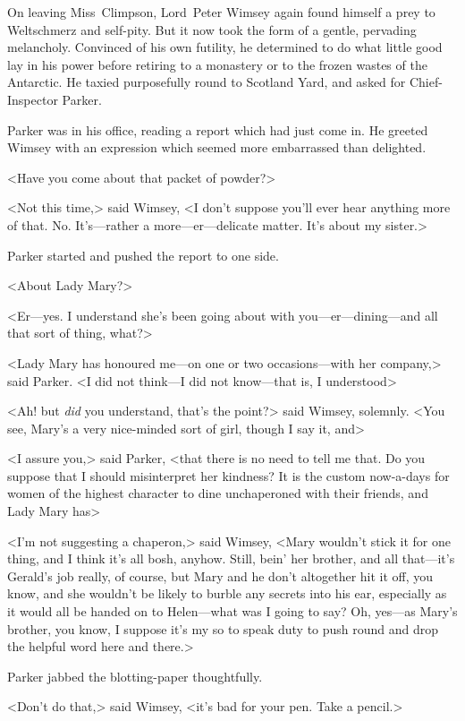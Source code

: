 On leaving Miss~Climpson, Lord~Peter Wimsey again found himself a prey to Weltschmerz and self-pity. But it now took the form of a gentle, pervading melancholy. Convinced of his own futility, he determined to do what little good lay in his power before retiring to a monastery or to the frozen wastes of the Antarctic. He taxied purposefully round to Scotland Yard, and asked for Chief-Inspector Parker.

Parker was in his office, reading a report which had just come in. He greeted Wimsey with an expression which seemed more embarrassed than delighted.

<Have you come about that packet of powder?>

<Not this time,> said Wimsey, <I don't suppose you'll ever hear anything more of that. No. It's—rather a more—er—delicate matter. It's about my sister.>

Parker started and pushed the report to one side.

<About Lady Mary?>

<Er—yes. I understand she's been going about with you—er—dining—and all that sort of thing, what?>

<Lady Mary has honoured me—on one or two occasions—with her company,> said Parker. <I did not think—I did not know—that is, I understood\longdash>

<Ah! but \emph{did} you understand, that's the point?> said Wimsey, solemnly. <You see, Mary's a very nice-minded sort of girl, though I say it, and\longdash>

<I assure you,> said Parker, <that there is no need to tell me that. Do you suppose that I should misinterpret her kindness? It is the custom now-a-days for women of the highest character to dine unchaperoned with their friends, and Lady Mary has\longdash>

<I'm not suggesting a chaperon,> said Wimsey, <Mary wouldn't stick it for one thing, and I think it's all bosh, anyhow. Still, bein' her brother, and all that—it's Gerald's job really, of course, but Mary and he don't altogether hit it off, you know, and she wouldn't be likely to burble any secrets into his ear, especially as it would all be handed on to Helen—what was I going to say? Oh, yes—as Mary's brother, you know, I suppose it's my so to speak duty to push round and drop the helpful word here and there.>

Parker jabbed the blotting-paper thoughtfully.

<Don't do that,> said Wimsey, <it's bad for your pen. Take a pencil.>

